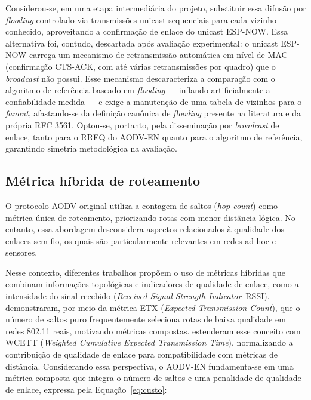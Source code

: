 Considerou-se, em uma etapa intermediária do projeto, substituir essa
difusão por \emph{flooding} controlado via transmissões unicast
sequenciais para cada vizinho conhecido, aproveitando a confirmação de
enlace do unicast ESP-NOW. Essa alternativa foi, contudo, descartada
após avaliação experimental: o unicast ESP-NOW carrega um mecanismo de
retransmissão automática em nível de MAC (confirmação CTS-ACK, com até
várias retransmissões por quadro) que o \emph{broadcast} não possui.
Esse mecanismo descaracteriza a comparação com o algoritmo de referência
baseado em \emph{flooding} --- inflando artificialmente a confiabilidade
medida --- e exige a manutenção de uma tabela de vizinhos para o
\emph{fanout}, afastando-se da definição canônica de \emph{flooding}
presente na literatura \cite{ni1999} e da própria RFC 3561. Optou-se,
portanto, pela disseminação por \emph{broadcast} de enlace, tanto para o
RREQ do AODV-EN quanto para o algoritmo de referência, garantindo
simetria metodológica na avaliação.

\subsection{Métrica híbrida de
roteamento}\label{muxe9trica-huxedbrida-de-roteamento}

O protocolo AODV original utiliza a contagem de saltos (\emph{hop
count}) como métrica única de roteamento, priorizando rotas com menor
distância lógica. No entanto, essa abordagem desconsidera aspectos
relacionados à qualidade dos enlaces sem fio, os quais são
particularmente relevantes em redes ad-hoc e sensores.

Nesse contexto, diferentes trabalhos propõem o uso de métricas híbridas
que combinam informações topológicas e indicadores de qualidade de
enlace, como a intensidade do sinal recebido (\emph{Received Signal
Strength Indicator}--RSSI).  demonstraram, por
meio da métrica ETX (\emph{Expected Transmission Count}), que o número
de saltos puro frequentemente seleciona rotas de baixa qualidade em
redes 802.11 reais, motivando métricas compostas. 
estenderam esse conceito com WCETT (\emph{Weighted Cumulative Expected
Transmission Time}), normalizando a contribuição de qualidade de enlace
para compatibilidade com métricas de distância. Considerando essa
perspectiva, o AODV-EN fundamenta-se em uma métrica composta que integra
o número de saltos e uma penalidade de qualidade de enlace, expressa pela
Equação~\ref{eq:custo}:

